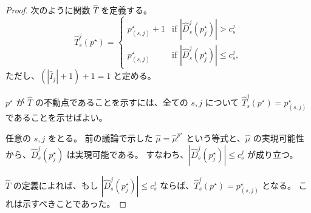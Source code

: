 \documentclass[12pt, a4paper]{article}
\theoremstyle{definition}
\theoremstyle{remark}
\theoremstyle{plain}
\begin{document}
\begin{proof}



次のように関数 \( \widehat{T} \) を定義する。
\[
\widehat{T}_s^j(p^\star) =
\begin{cases}
p^\star_{(s,j)} + 1 & \text{if } | \widehat{D}_s^j(p_j^\star) | > c^j_s \\
p^\star_{(s,j)}     & \text{if } | \widehat{D}_s^j(p_j^\star) | \leq c^j_s,
\end{cases}
\]
ただし、\( (|\widehat{I}_j| + 1) + 1 = 1 \) と定める。

\(p^\star\) が \( \widehat{T} \) の不動点であることを示すには、全ての \(s,j\) について \(\widehat{T}_s^j(p^\star) = p_{(s,j)}^\star\) であることを示せばよい。

任意の \(s, j\) をとる。
前の議論で示した \(\widehat{\mu} = \widehat{\mu}^{p^\star}\) という等式と、\(\widehat{\mu}\) の実現可能性から、\(\widehat{D}_s^j(p_j^\star)\) は実現可能である。
すなわち、\(|\widehat{D}_s^j(p_j^\star)| \leq c_s^j\) が成り立つ。

\( \widehat{T} \) の定義によれば、もし \(|\widehat{D}_s^j(p_j^\star)| \leq c_s^j\) ならば、\(\widehat{T}_s^j(p^\star) = p_{(s,j)}^\star\) となる。
これは示すべきことであった。





\end{proof}
\end{document}
